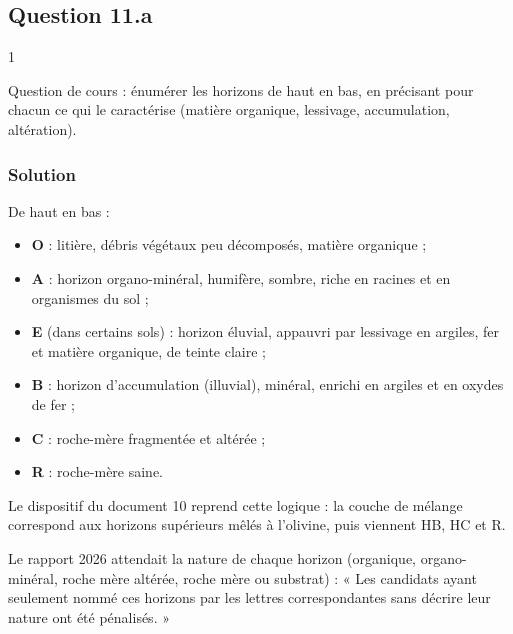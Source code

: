 \documentclass[11pt,a4paper]{article}
\providecommand{\tightlist}{\setlength{\itemsep}{0pt}\setlength{\parskip}{0pt}}
\begin{document}
\hypertarget{question-11.a}{%
\subsection{Question 11.a}\label{question-11.a}}

\begin{indication}{1}

Question de cours : énumérer les horizons de haut en bas, en précisant pour chacun ce qui le caractérise (matière organique, lessivage, accumulation, altération).

\end{indication}

\hypertarget{solution-36}{%
\subsubsection{Solution}\label{solution-36}}

De haut en bas :

\begin{itemize}
\tightlist
\item
  \textbf{O} : litière, débris végétaux peu décomposés, matière organique ;
\item
  \textbf{A} : horizon organo-minéral, humifère, sombre, riche en racines et en organismes du sol ;
\item
  \textbf{E} (dans certains sols) : horizon éluvial, appauvri par lessivage en argiles, fer et matière organique, de teinte claire ;
\item
  \textbf{B} : horizon d'accumulation (illuvial), minéral, enrichi en argiles et en oxydes de fer ;
\item
  \textbf{C} : roche-mère fragmentée et altérée ;
\item
  \textbf{R} : roche-mère saine.
\end{itemize}

Le dispositif du document 10 reprend cette logique : la couche de mélange correspond aux horizons supérieurs mêlés à l'olivine, puis viennent HB, HC et R.

\begin{jury}

Le rapport 2026 attendait la nature de chaque horizon (organique, organo-minéral, roche mère altérée, roche mère ou substrat) : « Les candidats ayant seulement nommé ces horizons par les lettres correspondantes sans décrire leur nature ont été pénalisés. »

\end{jury}
\end{document}
